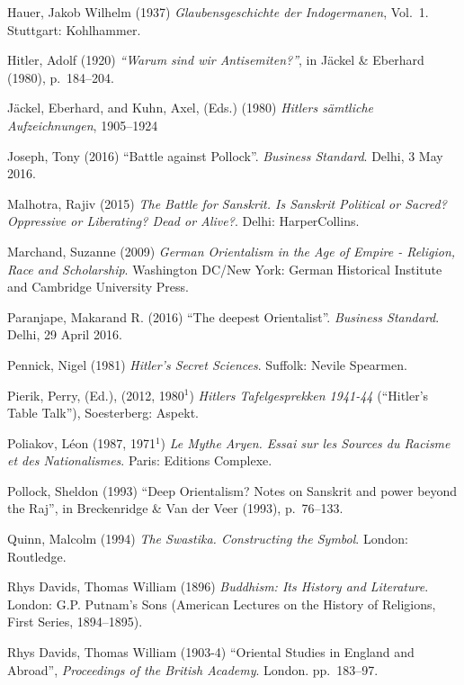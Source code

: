 \begin{thebibliography}{99}
Hauer, Jakob Wilhelm (1937) {\sl Glaubensgeschichte der Indogermanen}, Vol.~1. Stuttgart: Kohlhammer.

Hitler, Adolf (1920) {\sl “Warum sind wir Antisemiten?”}, in Jäckel \& Eberhard (1980), p.~184--204.

Jäckel, Eberhard, and Kuhn, Axel, (Eds.) (1980) {\sl Hitlers sämtliche Aufzeichnungen}, 1905--1924

Joseph, Tony (2016) “Battle against Pollock”. {\sl Business Standard}. Delhi, 3 May 2016.

Malhotra, Rajiv (2015) {\sl The Battle for Sanskrit. Is Sanskrit Political or Sacred? Oppressive or Liberating? Dead or Alive?}. Delhi: HarperCollins.

Marchand, Suzanne (2009) {\sl German Orientalism in the Age of Empire - Religion, Race and Scholarship}. Washington DC/New York: German Historical Institute and Cambridge University Press. 

Paranjape, Makarand R. (2016) “The deepest Orientalist”. {\sl Business Standard}. Delhi, 29 April 2016.

Pennick, Nigel (1981) {\sl Hitler’s Secret Sciences}. Suffolk: Nevile Spearmen.

Pierik, Perry, (Ed.), (2012, 1980$^1$) {\sl Hitlers Tafelgesprekken 1941-44} (“Hitler’s Table Talk”), Soesterberg: Aspekt.

Poliakov, Léon (1987, 1971$^1$) {\sl Le Mythe Aryen. Essai sur les Sources du Racisme et des Nationalismes}. Paris: Editions Complexe.

Pollock, Sheldon (1993) “Deep Orientalism? Notes on Sanskrit and power beyond the Raj”, in Breckenridge \& Van der Veer (1993), p.~76--133.

Quinn, Malcolm (1994) {\sl The Swastika. Constructing the Symbol}. London: Routledge.

Rhys Davids, Thomas William (1896) {\sl Buddhism: Its History and Literature}. London: G.P. Putnam’s Sons (American Lectures on the History of Religions, First Series, 1894--1895).

Rhys Davids, Thomas William (1903-4) “Oriental Studies in England and Abroad”, {\sl Proceedings of the British Academy}. London. pp.~183--97.


\end{thebibliography}
